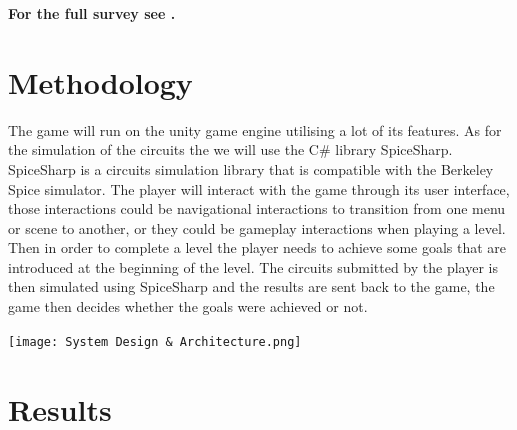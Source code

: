 \documentclass[twoside,a4paper,11pt]{article}
\begin{document}
\begin{multicols}{2}
\textbf{For the full survey see \cite{28}.}

\section{Methodology}

The game will run on the unity game engine utilising a lot of its features. As for the simulation of the circuits the we will use the C\# library SpiceSharp. SpiceSharp is a circuits simulation library that is compatible with the Berkeley Spice simulator. The player will interact with the game through its user interface, those interactions could be navigational interactions to transition from one menu or scene to another, or they could be gameplay interactions when playing a level. Then in order to complete a level the player needs to achieve some goals that are introduced at the beginning of the level. The circuits submitted by the player is then simulated using SpiceSharp and the results are sent back to the game, the game then decides whether the goals were achieved or not.

\begin{center}
    \texttt{[image: System Design \& Architecture.png]}
\end{center}
    
\section{Results} 

\end{multicols}
\end{document}
